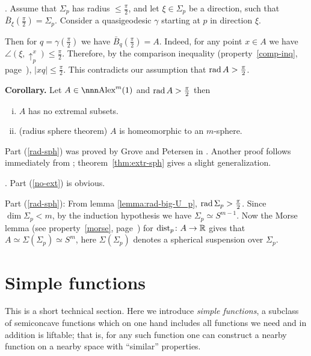 \documentclass{article}
\begin{document}
\Proof. Assume that $\Sigma_p$ has radius
$\leq\tfrac\pi2$, and let $\xi\in \Sigma_p$ be a direction, such that $\bar B_\xi
(\tfrac\pi2)=\Sigma_p$. 
Consider a quasigeodesic $\gamma$ starting at $p$ in direction $\xi$. 

Then for $q=\gamma(\tfrac\pi2)$ we have $\bar B_q(\tfrac\pi2)=A$. Indeed, for
any point $x\in A$ we have 
$\angle(\xi,\uparrow_p^x)\le\tfrac\pi2$. Therefore, by the comparison inequality
(property~\ref{comp-inq}, page~\pageref{comp-inq}),
$|x q|\le\tfrac\pi2$. 
This contradicts our assumption that $\operatorname{rad} A> \tfrac\pi2$. \qeds

\begin{thm}{\bf Corollary.}\label{cor:no-ext+rad-sph}
Let $A\in\Alex^m(1)$ and  $\operatorname{rad} A>\tfrac\pi2$ then 
\begin{enumerate}[(i)]
\item\label{no-ext} $A$ has no extremal subsets.
\item\label{rad-sph}(radius sphere theorem) $A$ is homeomorphic to an
$m$-sphere.
\end{enumerate}
\end{thm}

Part (\ref{rad-sph}) was proved by Grove and Petersen in \cite{grove-petersen:rad-sphere}.
Another proof follows immediately from \cite[1.2, 1.4.1]{perelman-petrunin:extremal}; 
theorem~\ref{thm:extr-sph} gives a slight generalization.

\Proof. Part (\ref{no-ext}) is obvious. 

Part (\ref{rad-sph}): From lemma \ref{lemma:rad-big-U_p}, $\operatorname{rad} \Sigma_p>\tfrac\pi2$. 
Since $\dim \Sigma_p<m$, by the induction hypothesis we have $\Sigma_p\simeq S^{m-1}$.
Now the Morse lemma (see property~\ref{morse}, page~\pageref{morse}) for
$\operatorname{dist}_p\colon A\to\mathbb{R}$ gives that $A\simeq\Sigma(\Sigma_p)\simeq S^m$, here $\Sigma(\Sigma_p)$ denotes a spherical suspension over $\Sigma_p$.\qeds













\section{Simple functions}
\label{adm}
\addtocounter{subsection}{1}
\setcounter{thm}{0}

This is a short technical section.
Here we introduce \emph{simple functions}, a subclass of semiconcave
functions which on one hand includes all functions we need and in addition is liftable; 
that is, for any such function one can construct a nearby function on a
nearby space with ``similar'' properties.
\end{document}
